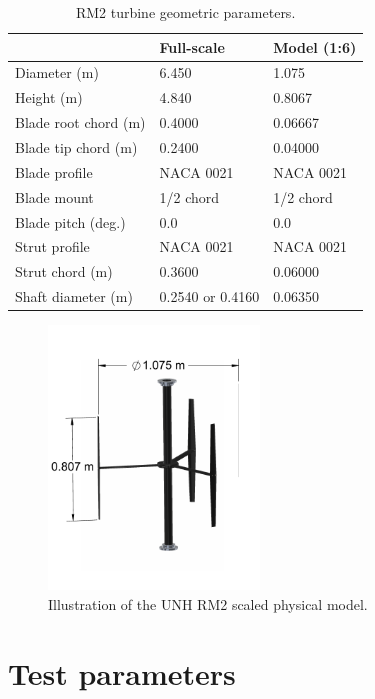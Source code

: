 \documentclass[12pt,letterpaper]{scrreprt}
\begin{document}
\begin{table}[ht]
\centering
\begin{tabular}{l|l|l}
   & Full-scale & Model (1:6) \\
\hline 
Diameter (m)   & 6.450 & 1.075 \\ 
Height (m)     & 4.840 & 0.8067 \\ 
Blade root chord (m) & 0.4000 & 0.06667 \\ 
Blade tip chord (m)  & 0.2400 & 0.04000 \\ 
Blade profile & NACA 0021 & NACA 0021 \\ 
Blade mount & 1/2 chord & 1/2 chord \\ 
Blade pitch (deg.) & 0.0 & 0.0 \\ 
Strut profile & NACA 0021 & NACA 0021 \\ 
Strut chord (m) & 0.3600 & 0.06000 \\ 
Shaft diameter (m) & 0.2540 \cite{Beam2011} or 0.4160 \cite{Hill2014} & 0.06350\\ 
\end{tabular}
\caption{RM2 turbine geometric parameters.}
\label{tab-turb_geom}
\end{table}

\begin{figure}[ht]
\centering
\includegraphics[width=0.5\textwidth]{Figures/turbine}
\caption{Illustration of the UNH RM2 scaled physical model.}
\label{fig-turbine_drawing}
\end{figure}


\section{Test parameters}
\end{document}
